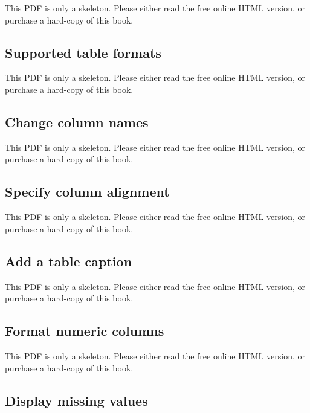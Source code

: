 \documentclass[
  11pt,
]{krantz}
\begin{document}
This PDF is only a skeleton. Please either read the free online HTML version, or purchase a hard-copy of this book.

\subsection{Supported table formats}\label{kable-formats}

This PDF is only a skeleton. Please either read the free online HTML version, or purchase a hard-copy of this book.

\subsection{Change column names}\label{change-column-names}

This PDF is only a skeleton. Please either read the free online HTML version, or purchase a hard-copy of this book.

\subsection{Specify column alignment}\label{specify-column-alignment}

This PDF is only a skeleton. Please either read the free online HTML version, or purchase a hard-copy of this book.

\subsection{Add a table caption}\label{kable-caption}

This PDF is only a skeleton. Please either read the free online HTML version, or purchase a hard-copy of this book.

\begin{table}\caption{\label{tab:kable-cap}An example table caption.}\end{table}

\subsection{Format numeric columns}\label{format-numeric-columns}

This PDF is only a skeleton. Please either read the free online HTML version, or purchase a hard-copy of this book.

\subsection{Display missing values}\label{display-missing-values}
\end{document}
